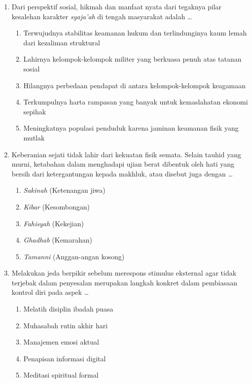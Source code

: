 \documentclass[12pt,a4paper]{article}
\begin{document}
\begin{enumerate}[leftmargin=*]
\item Dari perspektif sosial, hikmah dan manfaat nyata dari tegaknya pilar kesalehan karakter \textit{syaja'ah} di tengah masyarakat adalah \dots
    \begin{enumerate}[label=\alph*.]
        \item Terwujudnya stabilitas keamanan hukum dan terlindunginya kaum lemah dari kezaliman struktural
        \item Lahirnya kelompok-kelompok militer yang berkuasa penuh atas tatanan sosial
        \item Hilangnya perbedaan pendapat di antara kelompok-kelompok keagamaan
        \item Terkumpulnya harta rampasan yang banyak untuk kemaslahatan ekonomi sepihak
        \item Meningkatnya populasi penduduk karena jaminan keamanan fisik yang mutlak
    \end{enumerate}

\item Keberanian sejati tidak lahir dari kekuatan fisik semata. Selain tauhid yang murni, ketabahan dalam menghadapi ujian berat dibentuk oleh hati yang bersih dari ketergantungan kepada makhluk, atau disebut juga dengan \dots
    \begin{enumerate}[label=\alph*.]
        \item \textit{Sakinah} (Ketenangan jiwa)
        \item \textit{Kibar} (Kesombongan)
        \item \textit{Fahisyah} (Kekejian)
        \item \textit{Ghadhab} (Kemarahan)
        \item \textit{Tamanni} (Anggan-angan kosong)
    \end{enumerate}

\item Melakukan jeda berpikir sebelum merespons stimulus eksternal agar tidak terjebak dalam penyesalan merupakan langkah konkret dalam pembiasaan kontrol diri pada aspek \dots
    \begin{enumerate}[label=\alph*.]
        \item Melatih disiplin ibadah puasa
        \item Muhasabah rutin akhir hari
        \item Manajemen emosi aktual
        \item Penapisan informasi digital
        \item Meditasi spiritual formal
    \end{enumerate}


\end{enumerate}
\end{document}
